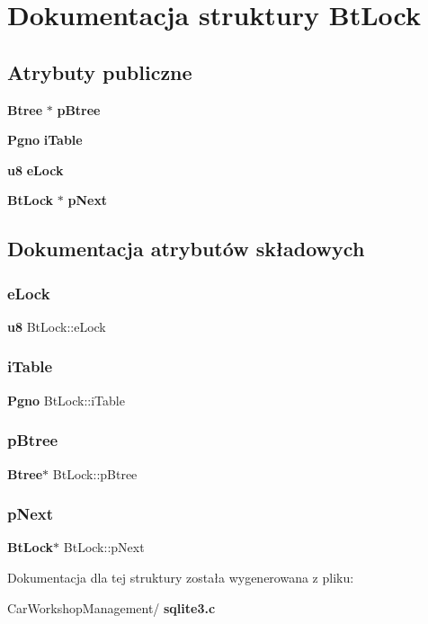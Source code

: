\section{Dokumentacja struktury Bt\+Lock}
\label{struct_bt_lock}
\subsection*{Atrybuty publiczne}
\begin{DoxyCompactItemize}
\item 
\textbf{ Btree} $\ast$ \textbf{ p\+Btree}
\item 
\textbf{ Pgno} \textbf{ i\+Table}
\item 
\textbf{ u8} \textbf{ e\+Lock}
\item 
\textbf{ Bt\+Lock} $\ast$ \textbf{ p\+Next}
\end{DoxyCompactItemize}


\subsection{Dokumentacja atrybutów składowych}
\mbox{\label{struct_bt_lock_abe07b71018ee423e0d94b5cdba044b5c}} 
\subsubsection{eLock}
{\footnotesize\ttfamily \textbf{ u8} Bt\+Lock\+::e\+Lock}

\mbox{\label{struct_bt_lock_a822efcf018d6c8eb343341cde5df980d}} 
\subsubsection{iTable}
{\footnotesize\ttfamily \textbf{ Pgno} Bt\+Lock\+::i\+Table}

\mbox{\label{struct_bt_lock_ab9125b8e79d480b75f3af21cb2ab55c7}} 
\subsubsection{pBtree}
{\footnotesize\ttfamily \textbf{ Btree}$\ast$ Bt\+Lock\+::p\+Btree}

\mbox{\label{struct_bt_lock_ad42de86209c7aab43604c52a549b7bca}} 
\subsubsection{pNext}
{\footnotesize\ttfamily \textbf{ Bt\+Lock}$\ast$ Bt\+Lock\+::p\+Next}



Dokumentacja dla tej struktury została wygenerowana z pliku\+:\begin{DoxyCompactItemize}
\item 
Car\+Workshop\+Management/\textbf{ sqlite3.\+c}\end{DoxyCompactItemize}
